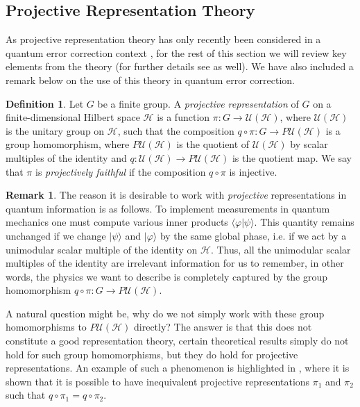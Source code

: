 \documentclass[11pt]{article}
\theoremstyle{definition}
\newtheorem{definition}{Definition}
\newtheorem*{remark}{Remark}
\def\ket#1{| #1 \rangle}
\newcommand{\calH}{\mathcal{H}}
\newcommand{\calU}{\mathcal{U}}
\begin{document}
\subsection{Projective Representation Theory}

As projective representation theory has only recently been considered in a quantum error correction context \cite{Eidesen2025}, for the rest of this section we will review key elements from the theory (for further details see \cite{CeccheriniSilbersteinTullio22} as well). We have also included a remark below on the use of this theory in quantum error correction. 

\begin{definition}\label{projrepdefn}
    Let $G$ be a finite group. A {\it projective representation} of $G$ on a finite-dimensional Hilbert space $\calH$ is a function $\pi \colon G \to \calU(\calH)$, where $\calU(\calH)$ is the unitary group on $\mathcal H$, such that the composition $q \circ \pi \colon G \to P\calU(\calH)$ is a group homomorphism, where $P\calU(\calH)$ is the quotient of $\calU(\calH)$ by scalar multiples of the identity and $q \colon \calU(\calH) \to P\calU(\calH)$ is the quotient map. We say that $\pi$ is \emph{projectively faithful} if the composition $q \circ \pi$ is injective. 
\end{definition} 


\begin{remark}\label{rem:reason for projective}
    The reason it is desirable to work with \emph{projective} representations in quantum information is as follows. To implement measurements in quantum mechanics one must compute various inner products  $\langle\varphi\vert\psi\rangle$. This quantity remains unchanged if we change $\ket{\psi}$ and $\ket{\varphi}$ by the same global phase, i.e. if we act by a unimodular scalar multiple of the identity on $\calH$. Thus, all the unimodular scalar multiples of the identity are irrelevant information for us to remember, in other words, the physics we want to describe is completely captured by the group homomorphism $q \circ \pi \colon G \to P\calU(\calH)$.

    A natural question might be, why do we not simply work with these group homomorphisms to $P\calU(\calH)$ directly? The answer is that this does not constitute a good representation theory, certain theoretical results simply do not hold for such group homomorphisms, but they do hold for projective representations. An example of such a phenomenon is highlighted in \cite[Section 3]{Eidesen2025}, where it is shown that it is possible to have inequivalent projective representations $\pi_1$ and $\pi_2$ such that $q \circ \pi_1 = q \circ \pi_2$.
\end{remark}
\end{document}
